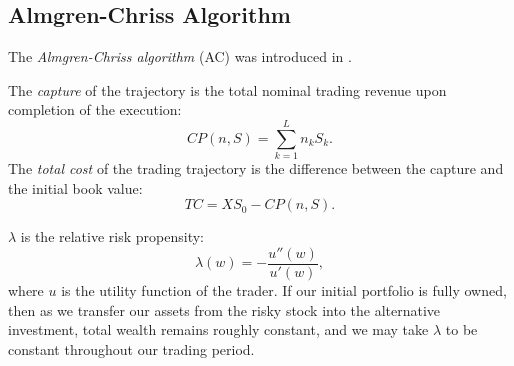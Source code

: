     \subsection{Almgren-Chriss Algorithm}
        The \emph{Almgren-Chriss algorithm} (AC) was introduced in \cite{Almgren2000}.

        \begin{definition}
            The \emph{capture} of the trajectory is the total nominal trading revenue upon completion of the execution:
            \begin{equation*}
                CP(n, S) = \sum_{k=1}^{L} n_kS_k.
            \end{equation*}
            The \emph{total cost} of the trading trajectory is the difference between the capture and the initial book value:
            \begin{equation*}
                TC = XS_0 - CP(n, S).
            \end{equation*}
        \end{definition}
        \noindent$\lambda$ is the relative risk propensity:
        \begin{equation*}
            \lambda(w) = -\frac{u''(w)}{u'(w)},
        \end{equation*}
        where $u$ is the utility function of the trader. If our initial portfolio is fully owned, then as we transfer our assets from the 
        risky stock into the alternative investment, total wealth remains roughly constant, and we may take $\lambda$ to be constant throughout our trading period.
        
